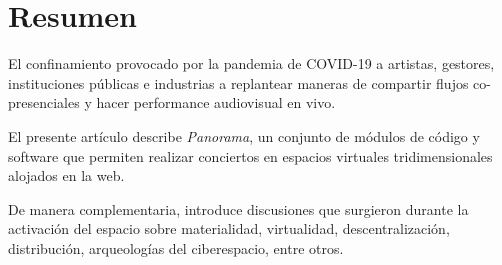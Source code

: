 \section*{Resumen}

El confinamiento provocado por la pandemia de COVID-19  a artistas, gestores, instituciones públicas e industrias a replantear maneras de compartir flujos co-presenciales y hacer performance audiovisual en vivo. %

El presente artículo describe \textit{Panorama}, un conjunto de módulos de código y software que permiten realizar conciertos en espacios virtuales tridimensionales alojados en la web.

De manera complementaria, introduce discusiones que surgieron durante la activación del espacio sobre materialidad, virtualidad, descentralización, distribución, arqueologías del ciberespacio, entre otros.                       
